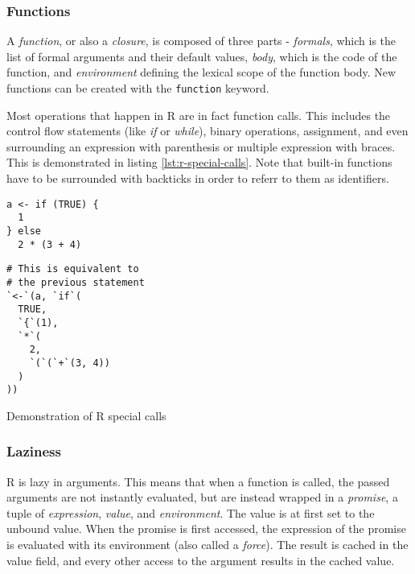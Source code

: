 \subsubsection*{Functions}

A \textit{function}, or also a \textit{closure}, is composed of three parts - \textit{formals}, which is the list of formal arguments and their default values, \textit{body}, which is the code of the function, and \textit{environment} defining the lexical scope of the function body. New functions can be created with the \texttt{function} keyword.

Most operations that happen in R are in fact function calls. This includes the control flow statements (like \textit{if} or \textit{while}), binary operations, assignment, and even surrounding an expression with parenthesis or multiple expression with braces. This is demonstrated in listing \ref{lst:r-special-calls}. Note that built-in functions have to be surrounded with backticks in order to referr to them as identifiers.

\begin{listing}[ht!]
	\begin{sublisting}[t!]{0.47\textwidth}
		\centering
		\begin{verbatim}
a <- if (TRUE) {
  1
} else
  2 * (3 + 4)
    \end{verbatim}
	\end{sublisting}
	\hfill
	\begin{sublisting}[t!]{0.47\textwidth}
		\centering
		\begin{verbatim}
# This is equivalent to
# the previous statement
`<-`(a, `if`(
  TRUE,
  `{`(1),
  `*`(
    2,
    `(`(`+`(3, 4))
  )
))
    \end{verbatim}
	\end{sublisting}
	\caption{Demonstration of R special calls}\label{lst:r-special-calls}
\end{listing}

\subsubsection*{Laziness}

R is lazy in arguments. This means that when a function is called, the passed arguments are not instantly evaluated, but are instead wrapped in a \textit{promise}, a tuple of \textit{expression}, \textit{value}, and \textit{environment}. The value is at first set to the unbound value. When the promise is first accessed, the expression of the promise is evaluated with its environment (also called a \textit{force}). The result is cached in the value field, and every other access to the argument results in the cached value.

